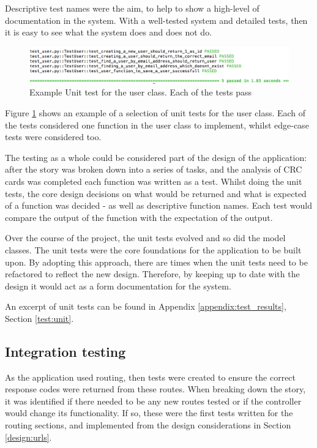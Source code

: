 Descriptive test names were the aim, to help to show a high-level of documentation in the system. With a well-tested system and detailed tests, then it is easy to see what the system does and does not do.

\begin{figure}[h!]
  \centering
  \includegraphics[width=\textwidth]{images/unit_test_user}
  \caption{Example Unit test for the user class. Each of the tests pass}
  \label{fig:unit_user}
\end{figure}

Figure \ref{fig:unit_user} shows an example of a selection of unit tests for the user class. Each of the tests considered one function in the user class to implement, whilst edge-case tests were considered too.

The testing as a whole could be considered part of the design of the application: after the story was broken down into a series of tasks, and the analysis of CRC cards was completed each function was written as a test. Whilst doing the unit tests, the core design decisions on what would be returned and what is expected of a function was decided - as well as descriptive function names. Each test would compare the output of the function with the expectation of the output.

Over the course of the project, the unit tests evolved and so did the model classes. The unit tests were the core foundations for the application to be built upon. By adopting this approach, there are times when the unit tests need to be refactored to reflect the new design. Therefore, by keeping up to date with the design it would act as a form documentation for the system.

An excerpt of unit tests can be found in Appendix \ref{appendix:test_results}, Section \ref{test:unit}.

\subsection{Integration testing}
As the application used routing, then tests were created to ensure the correct response codes were returned from these routes. When breaking down the story, it was identified if there needed to be any new routes tested or if the controller would change its functionality. If so, these were the first tests written for the routing sections, and implemented from the design considerations in Section \ref{design:urls}.

